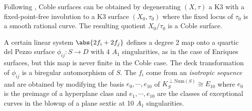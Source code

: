 \documentclass[../main.tex]{subfiles}
\begin{document}
\begin{remark}
Following \cite[\S 5.1]{Dol17}, Coble surfaces can be obtained by degenerating $(X, \tau)$ a K3 with a fixed-point-free involution to a K3 surface $(X_0, \tau_0)$ where the fixed locus of $\tau_0$ is a smooth rational curve. The resulting quotient $X_0/\tau_0$ is a Coble surface. 

A certain linear system $\abs{2f_i + 2f_j}$ defines a degree 2 map onto a quartic del Pezzo surface $\phi_{ij}: S\to D$ with 4 $A_1$ singularities, as in the case of Enriques surfaces, but this map is never finite in the Coble case. The deck transformation of $\phi_{ij}$ is a biregular automorphism of $S$. The $f_i$ come from an \textit{isotropic sequence} and are obtained by modifying the basis $e_0,\cdots, e_{10}$ of $K_S^{\perp \mathrm{Num}(S)} \cong E_{10}$ where $e_0$ is the preimage of a hyperplane class and $e_1,\cdots, e_{10}$ are the classes of exceptional curves in the blowup of a plane sextic at 10 $A_1$ singularities.

\end{remark}
\end{document}
